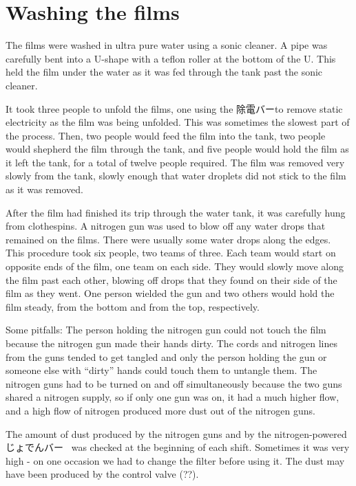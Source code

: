 \documentclass{article}
\begin{document}
\section{Washing the films}
The films were washed in ultra pure water using a sonic cleaner. A pipe was carefully bent into a U-shape with a teflon roller at the bottom of the U. This held the film under the water as it was fed through the tank past the sonic cleaner. 

It took three people to unfold the films, one using the 除電バーto remove static electricity as the film was being unfolded. This was sometimes the slowest part of the process. Then, two people would feed the film into the tank, two people would shepherd the film through the tank, and five people would hold the film as it left the tank, for a total of twelve people required. The film was removed very slowly from the tank, slowly enough that water droplets did not stick to the film as it was removed. 

After the film had finished its trip through the water tank, it was carefully hung from clothespins. A nitrogen gun was used to blow off any water drops that remained on the films. There were usually some water drops along the edges. This procedure took six people, two teams of three. Each team would start on opposite ends of the film, one team on each side. They would slowly move along the film past each other, blowing off drops that they found on their side of the film as they went. One person wielded the gun and two others would hold the film steady, from the bottom and from the top, respectively. 

Some pitfalls: The person holding the nitrogen gun could not touch the film because the nitrogen gun made their hands dirty. The cords and nitrogen lines from the guns tended to get tangled and only the person holding the gun or someone else with ``dirty'' hands could touch them to untangle them.  The nitrogen guns had to be turned on and off simultaneously because the two guns shared a nitrogen supply, so if only one gun was on, it had a much higher flow, and a high flow of nitrogen produced more dust out of the nitrogen guns.  

The amount of dust produced by the nitrogen guns and by the nitrogen-powered じょでんバー\mbox{ } was checked at the beginning of each shift. Sometimes it was very high - on one occasion we had to change the filter before using it. The dust may have been produced by the control valve (??). 
\end{document}
